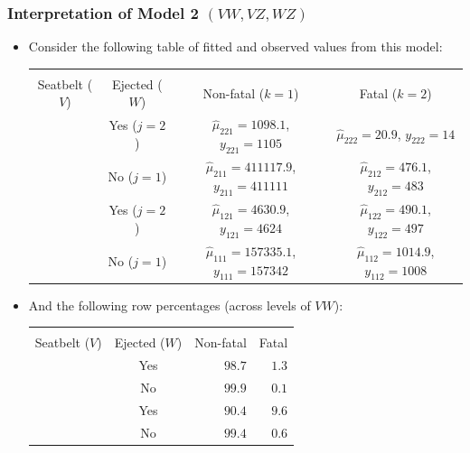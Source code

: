 \documentclass[oneside]{book}\usepackage[]{graphicx}\usepackage[svgnames]{xcolor}
\begin{document}
\subsubsection*{Interpretation of Model 2 $(VW , VZ , WZ )$}
\begin{itemize}
    \item Consider the following table of fitted and observed values from this model:
          \begin{table}[H]
              \centering
              \begin{NiceTabular}{cccc}
                  \toprule
                  &                 &            \\
                  Seatbelt ($ V $) & Ejected ($ W $) & Non-fatal ($ k=1 $) & Fatal ($ k=2 $)          \\
                  \midrule
                   & Yes  ($ j=2 $) & $ \hat{\mu}_{221}=1098.1 $, $y_{221}=1105 $ & $ \hat{\mu}_{222}=20.9 $, $ y_{222}=14 $\\
                  & No  ($ j=1 $) & $ \hat{\mu}_{211}=411117.9 $, $ y_{211}=411111 $ & $ \hat{\mu}_{212}=476.1 $, $ y_{212}=483 $\\
                   & Yes ($ j=2 $) & $ \hat{\mu}_{121}=4630.9 $, $ y_{121}=4624 $ & $ \hat{\mu}_{122}=490.1 $, $ y_{122}=497 $\\
                  & No ($ j=1 $) & $ \hat{\mu}_{111}=157335.1 $, $ y_{111}=157342 $ & $ \hat{\mu}_{112}=1014.9 $, $ y_{112}=1008 $\\
                  \bottomrule
              \end{NiceTabular}
          \end{table}
    \item And the following row percentages (across levels of $ VW $):
          \begin{table}[H]
              \centering
              \begin{NiceTabular}{ccrr}
                  \toprule
                  &                 &            \\
                  Seatbelt ($ V $) & Ejected ($ W $) & Non-fatal & Fatal          \\
                  \midrule
                   & Yes & $ 98.7 $ & $ 1.3 $\\
                  & No & $ 99.9 $ & $ 0.1 $\\
                   & Yes & $ 90.4 $ & $ 9.6 $\\
                  & No & $ 99.4 $ & $ 0.6 $\\
                  \bottomrule
              \end{NiceTabular}
          \end{table}
\end{itemize}
\end{document}
